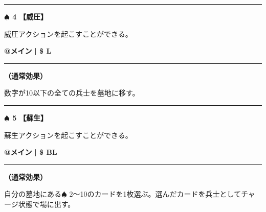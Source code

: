 \documentclass[twocolumn,a5paper,papersize,10pt]{jarticle}
\begin{document}
\vspace{-1zh}
  
 

\vspace{3mm} %
\hrule height 0.5mm depth 0mm width 66.5mm %
\vspace{1mm} %
{\Large\bf $\spadesuit$ 4} {\normalsize\bf【威圧】} %
\vspace{1mm} %

威圧アクションを起こすことができる。

\begin{tcolorbox}[title={\small\bf【Action】威圧}{\scriptsize （通常魔法）}]

{\scriptsize\bf @メイン }
  {\scriptsize\bf | \$ L }

\vspace{1mm} %
\hrule height 0.1mm depth 0mm width 62mm %
\vspace{1mm} %

{\bf（通常効果）}

数字が10以下の全ての兵士を墓地に移す。

\vspace{1mm} %
\end{tcolorbox}

\vspace{-1zh}
  
 

\vspace{3mm} %
\hrule height 0.5mm depth 0mm width 66.5mm %
\vspace{1mm} %
{\Large\bf $\spadesuit$ 5} {\normalsize\bf【蘇生】} %
\vspace{1mm} %

蘇生アクションを起こすことができる。

\begin{tcolorbox}[title={\small\bf【Action】蘇生}{\scriptsize （通常魔法）}]

{\scriptsize\bf @メイン }
  {\scriptsize\bf | \$ BL }

\vspace{1mm} %
\hrule height 0.1mm depth 0mm width 62mm %
\vspace{1mm} %

{\bf（通常効果）}

自分の墓地にある{\normalsize $\spadesuit$} 2〜10のカードを1枚選ぶ。選んだカードを兵士としてチャージ状態で場に出す。

\vspace{1mm} %
\end{tcolorbox}
\end{document}
